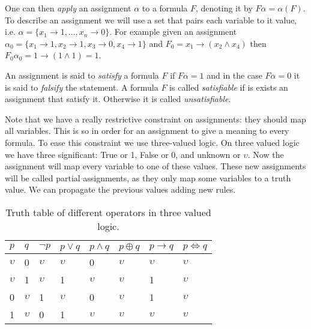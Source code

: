 One can then \emph{apply} an assignment $\alpha$ to a formula $F$, denoting it by $F\alpha=\alpha(F)$. To describe an assignment we will use a set that pairs each variable to it value, i.e. $\alpha=\{x_1\to 1,...,x_n\to 0\}$. For example given an assignment $\alpha_0 = \{x_1 \to 1, x_2\to 1, x_3 \to 0, x_4 \to 1\}$ and $F_0=x_1\to (x_2\wedge x_4)$ then  $F_0\alpha_0=1 \to (1\wedge 1)= 1$. \\    

\begin{definition}
  An assignment is said to \emph{satisfy}  a formula $F$ if $F\alpha=1$ and in the case $F  \alpha = 0 $ it is said to \emph{falsify} the statement. A formula $F$ is called \emph{satisfiable} if is exists an assignment that satisfy it. Otherwise it is called \emph{unsatisfiable}.
\end{definition}


Note that we have a really restrictive constraint on assignments: they should map all variables.  This is so in order for an assignment to give a meaning to every formula. To ease this constraint we use three-valued logic. On three valued logic we have three significant: True or 1, False or 0, and unknown or $\upsilon$. Now the assignment will map every variable to one of these values. These new assignments will be called partial assignments, as they only map some variables to a truth value. We can propagate the previous values adding new rules.

\begin{table}[h]
  \begin{center}
    \begin{tabular}{|l|l|l|l|l|l|l|l|}
      \hline
      $p$ & $q$ & $\neg p$& $p\vee q$ & $p\wedge q$ & $p \oplus q$ & $p \to q $  & $p \iff q$  \\ 
      \hline
      
      $\upsilon$ & 0 & $\upsilon$ & $\upsilon$ & 0 & $\upsilon$ & $\upsilon$ & $\upsilon$\\
      $\upsilon$ & 1 & $\upsilon$ & 1 & $\upsilon$ & $\upsilon$ & 1 &$\upsilon$\\
      0 & $\upsilon$ & 1 & $\upsilon$ & 0 & $\upsilon$ & 1 &$\upsilon$\\
      1 & $\upsilon$ & 0 & 1 & $\upsilon$ & $\upsilon$ & $\upsilon$ &$\upsilon$\\
      \hline

    \end{tabular}
  \end{center}
  \caption{\label{tab:table-name}Truth table of different operators in three valued logic.}
\end{table}


